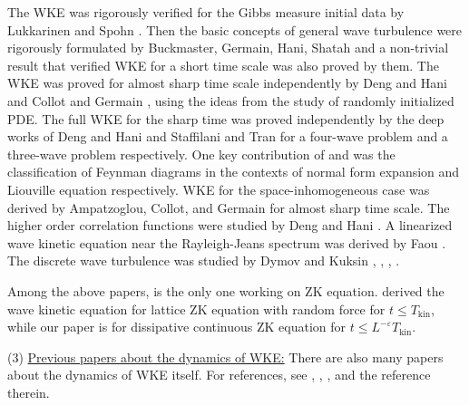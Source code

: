 The WKE was rigorously verified for the Gibbs measure initial data by Lukkarinen and Spohn \cite{lukkarinen2011weakly}. Then the basic concepts of general wave turbulence were rigorously formulated by Buckmaster, Germain, Hani, Shatah \cite{buckmaster2021onset} and a non-trivial result that verified WKE for a short time scale was also proved by them. The WKE was proved for almost sharp time scale independently by Deng and Hani \cite{deng2021derivation} and Collot and Germain \cite{collot2019derivation}, \cite{collot2020derivation} using the ideas from the study of randomly initialized PDE. The full WKE for the sharp time was proved independently by the deep works of Deng and Hani \cite{deng2021full} and Staffilani and Tran \cite{staffilani2021wave} for a four-wave problem and a three-wave problem respectively. One key contribution of \cite{deng2021full} and \cite{staffilani2021wave} was the classification of Feynman diagrams in the contexts of normal form expansion and Liouville equation respectively. WKE for the space-inhomogeneous case was derived by Ampatzoglou, Collot, and Germain \cite{ampatzoglou2021derivation} for almost sharp time scale. The higher order correlation functions were studied by Deng and Hani \cite{deng2021propagation}. A linearized wave kinetic equation near the Rayleigh-Jeans spectrum was derived by Faou \cite{faou2020linearized}. The discrete wave turbulence was studied by Dymov and Kuksin \cite{dymov2021formal}, \cite{dymov2020zakharov}, \cite{dymov2023formal}, \cite{dymov2021large}.
 

Among the above papers, \cite{staffilani2021wave} is the only one working on ZK equation. \cite{staffilani2021wave} derived the wave kinetic equation for lattice ZK equation with random force for $t\le T_{\text{kin}}$, while our paper is for dissipative continuous ZK equation for $t\le L^{-\varepsilon}T_{\text{kin}}$.



(3) \underline{Previous papers about the dynamics of WKE:} There are also many papers about the dynamics of WKE itself. For references, see \cite{germain2020optimal}, \cite{gamba2020wave}, \cite{soffer2018dynamics}, \cite{soffer2020energy} and the reference therein.




